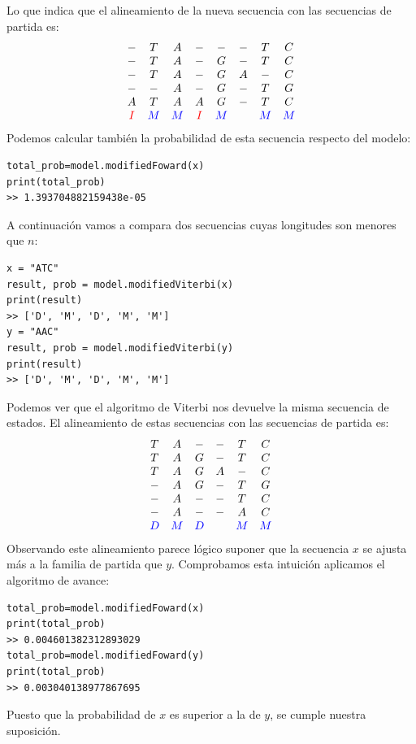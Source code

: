 \begin{exampleth}
Lo que indica que el alineamiento de la nueva secuencia con las secuencias de partida es:
    \[\begin{array}{c c c c c c c c}
        - & T & A & - & - & - & T & C \\
        - & T & A & - & G & - & T & C \\
        - & T & A & - & G & A & - & C \\
        - & - & A & - & G & - & T & G \\
        A & T & A & A & G & - & T & C \\
        \textcolor{red}{I}& \textcolor{blue}{M} & \textcolor{blue}{M} & \textcolor{red}{I} & \textcolor{blue}{M} & & \textcolor{blue}{M} & \textcolor{blue}{M}
    \end{array}\]  
Podemos calcular también la probabilidad de esta secuencia respecto del modelo:
\begin{verbatim}
total_prob=model.modifiedFoward(x)
print(total_prob)
>> 1.393704882159438e-05
\end{verbatim}

A continuación vamos a compara dos secuencias cuyas longitudes son menores que $n$:
\begin{verbatim}
x = "ATC"
result, prob = model.modifiedViterbi(x)
print(result)
>> ['D', 'M', 'D', 'M', 'M']
y = "AAC"
result, prob = model.modifiedViterbi(y)
print(result)
>> ['D', 'M', 'D', 'M', 'M']
\end{verbatim}
Podemos ver que el algoritmo de Viterbi nos devuelve la misma secuencia de estados. El alineamiento de estas secuencias con las secuencias de partida es:
    \[\begin{array}{c c c c c c}
         T & A & - & - & T & C \\
         T & A & G & - & T & C \\
         T & A & G & A & - & C \\
         - & A & G & - & T & G \\
         - & A & - & - & T & C \\
         - & A & - & - & A & C \\
        \textcolor{blue}{D} & \textcolor{blue}{M} & \textcolor{blue}{D} & & \textcolor{blue}{M} & \textcolor{blue}{M}
    \end{array}\]  
Observando este alineamiento parece lógico suponer que la secuencia $x$ se ajusta más a la familia de partida que $y$. Comprobamos esta intuición aplicamos el algoritmo de avance:
\begin{verbatim}
total_prob=model.modifiedFoward(x)
print(total_prob)
>> 0.004601382312893029
total_prob=model.modifiedFoward(y)
print(total_prob)
>> 0.003040138977867695
\end{verbatim}
Puesto que la probabilidad de $x$ es superior a la de $y$, se cumple nuestra suposición.
\end{exampleth}
